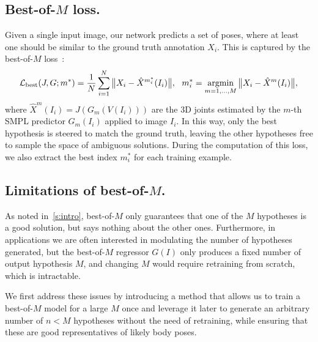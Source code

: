 \subsection{Best-of-$M$ loss.}
Given a single input image, our network predicts a set of poses, where at least one should be similar to the ground truth annotation $X_i$.
This is captured by the best-of-$M$ loss~\cite{guzman2012multiple}:
\begin{equation}\label{e:loss-best}
  \mathcal{L}_\text{best}(J,G;m^*)
  =
  \frac{1}{N}
  \sum_{i=1}^N
  \big \| X_i - \hat X^{m_i^*}(I_i) \big \|,
  ~~
  m_i^*
  =
  \operatornamewithlimits{argmin}_{m=1,\dots,M}
  \big \| X_i -  \hat X^{m}(I_i) \big \|,
\end{equation}
where $\hat X^{m}(I_i) = J(G_m(V(I_i)))$ are the 3D joints estimated by the $m$-th SMPL predictor $G_m(I_i)$ applied to image $I_i$.
In this way, only the best hypothesis is steered to match the ground truth, leaving the other hypotheses free to sample the space of ambiguous solutions.
During the computation of this loss, we also extract the best index $m^*_i$ for each training example.

\subsection{Limitations of best-of-$M$.}

As noted in~\cref{s:intro}, best-of-$M$ only guarantees that one of the $M$ hypotheses is a good solution, but says nothing about the other ones.
Furthermore, in applications we are often interested in modulating the number of hypotheses generated, but the best-of-$M$ regressor $G(I)$ only produces a fixed number of output hypothesis $M$, and changing $M$ would require retraining from scratch, which is intractable.

We first address these issues by introducing a method that allows us to train a best-of-$M$ model for a large $M$ once and leverage it later to generate an arbitrary number of $n < M$ hypotheses without the need of retraining, while ensuring that these are good representatives of likely body poses.

